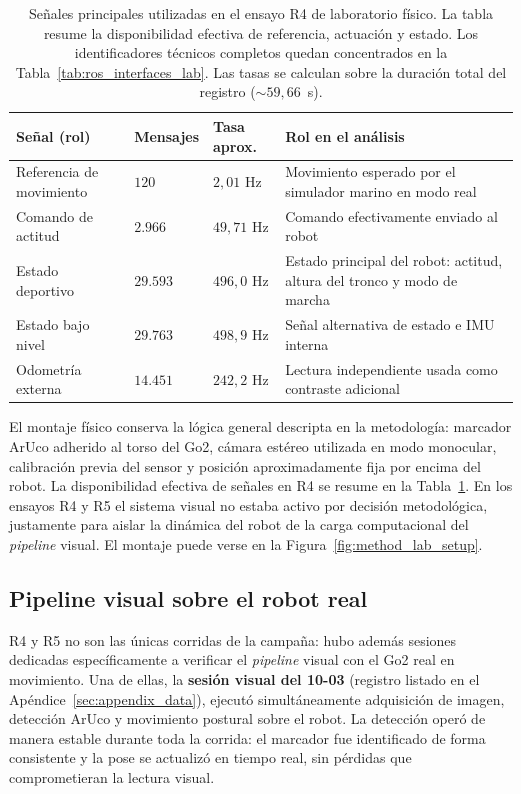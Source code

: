 \documentclass[12pt,a4paper]{report}
\begin{document}
\begin{table}[H]
\centering
\caption{Señales principales utilizadas en el ensayo R4 de laboratorio
físico. La tabla resume la disponibilidad efectiva de referencia, actuación y
estado. Los identificadores técnicos completos quedan concentrados en la
Tabla~\ref{tab:ros_interfaces_lab}. Las tasas se calculan sobre la duración
total del registro (\(\sim 59{,}66\)~s).}
\label{tab:lab_signals_summary}
\begin{tabular}{p{}p{}p{}p{}}
\toprule
Señal (rol) & Mensajes & Tasa aprox. & Rol en el análisis \\
\midrule
Referencia de movimiento & \(120\) & \(2{,}01\) Hz & Movimiento esperado por el simulador marino en modo real \\
Comando de actitud & \(2{.}966\) & \(49{,}71\) Hz & Comando efectivamente enviado al robot \\
Estado deportivo & \(29{.}593\) & \(496{,}0\) Hz & Estado principal del robot: actitud, altura del tronco y modo de marcha \\
Estado bajo nivel & \(29{.}763\) & \(498{,}9\) Hz & Señal alternativa de estado e IMU interna \\
Odometría externa & \(14{.}451\) & \(242{,}2\) Hz & Lectura independiente usada como contraste adicional \\
\bottomrule
\end{tabular}
\end{table}

El montaje físico conserva la lógica general descripta en la metodología:
marcador ArUco adherido al torso del Go2, cámara estéreo utilizada en modo
monocular, calibración previa del sensor y posición aproximadamente fija por
encima del robot. La disponibilidad efectiva de señales en R4 se resume en la
Tabla~\ref{tab:lab_signals_summary}. En los ensayos R4 y R5 el sistema visual no estaba activo
por decisión metodológica, justamente para aislar la dinámica del robot de la
carga computacional del \textit{pipeline} visual. El montaje puede verse en la
Figura~\ref{fig:method_lab_setup}.

\subsection{Pipeline visual sobre el robot real}
\label{sec:lab_aruco_realtime}

R4 y R5 no son las únicas corridas de la campaña: hubo además sesiones
dedicadas específicamente a verificar el \textit{pipeline} visual con el Go2 real en
movimiento. Una de ellas, la \textbf{sesión visual del 10-03}
(registro listado en el Apéndice~\ref{sec:appendix_data}), ejecutó
simultáneamente adquisición de imagen, detección ArUco y movimiento postural
sobre el robot. La detección operó de manera estable durante toda la corrida: el
marcador fue identificado de forma consistente y la pose se actualizó en tiempo
real, sin pérdidas que comprometieran la lectura visual.
\end{document}

